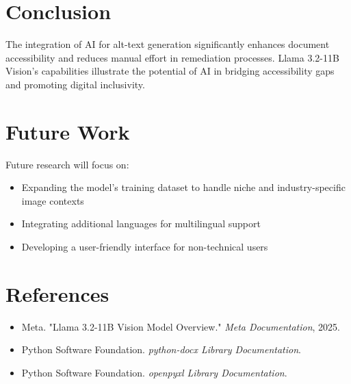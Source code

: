 \documentclass[12pt]{article}
\begin{document}
\section{Conclusion}
The integration of AI for alt-text generation significantly enhances document accessibility and reduces manual effort in remediation processes. Llama 3.2-11B Vision’s capabilities illustrate the potential of AI in bridging accessibility gaps and promoting digital inclusivity.

\section{Future Work}
Future research will focus on:
\begin{itemize}
    \item Expanding the model’s training dataset to handle niche and industry-specific image contexts
    \item Integrating additional languages for multilingual support
    \item Developing a user-friendly interface for non-technical users
\end{itemize}

\section{References}
\begin{itemize}
    \item Meta. "Llama 3.2-11B Vision Model Overview." \textit{Meta Documentation}, 2025.
    \item Python Software Foundation. \textit{python-docx Library Documentation}.
    \item Python Software Foundation. \textit{openpyxl Library Documentation}.
\end{itemize}
\end{document}

